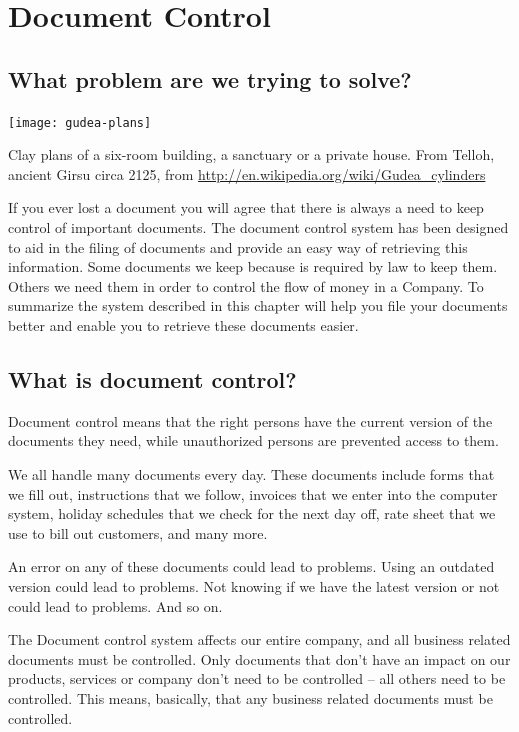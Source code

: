 \chapter{Document Control}

\section*{What problem are we trying to solve?}
\begin{marginfigure}
  \texttt{[image: gudea-plans]}
  \caption{Clay plans of a six-room building, a sanctuary or a private house. From Telloh, ancient Girsu circa 2125, from \url{http://en.wikipedia.org/wiki/Gudea_cylinders}}
  \label{fig:marginfig1}
\end{marginfigure}
If you ever lost a document you will agree that there is always a need to keep control of important documents. The document control system has been designed to aid in the  filing of documents and provide an easy way of retrieving this information.
Some documents we keep because is required by law to keep them. Others we need them in order to control the flow of money in a Company. To summarize the system described in this chapter will help you file your documents better and enable you to retrieve these documents easier.

\section*{What is document control?}

Document control means that the right persons have the current version of the documents they need, while unauthorized persons are prevented access to them.

We all handle many documents every day. These documents include forms that we fill out, instructions that we follow, invoices that we enter into the computer system, holiday schedules that we check for the next day off, rate sheet that we use to bill out customers, and many more.

An error on any of these documents could lead to problems. Using an outdated version could lead to problems. Not knowing if we have the latest version or not could lead to problems. And so on.

The Document control system affects our entire company, and all business related documents must be controlled. Only documents that don’t have an impact on our products, services or company don’t need to be controlled – all others need to be controlled. This means, basically, that any business related documents must be controlled. 

